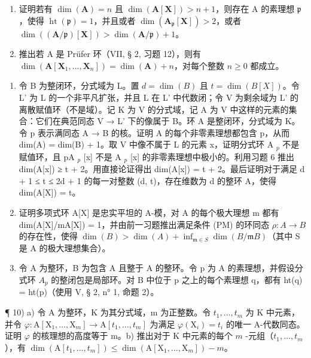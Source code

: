 \begin{enumerate}
\def\labelenumi{\alph{enumi})}
\setcounter{enumi}{1}
\tightlist
\item
  证明若有 \(\dim(\mathbf{A}) = n\) 且 \(\dim(\mathbf{A}[\mathbf{X}]) > n + 1\)，则存在 A 的素理想 \(\mathfrak{p}\)，使得 \(\operatorname{ht}(\mathfrak{p}) = 1\)，并且或者 \(\dim(\mathbf{A}_{\mathfrak{p}}[\mathbf{X}]) > 2\)，或者 \(\dim((\mathbf{A}/\mathfrak{p})[\mathbf{X}]) > \dim(\mathbf{A}/\mathfrak{p}) + 1\)。
\item
  推出若 A 是 Prüfer 环（VII, § 2, 习题 12），则有 \(\dim(\mathbf{A}[\mathbf{X}_1, ..., \mathbf{X}_n]) = \dim(\mathbf{A}) + n\)，对每个整数 \(n \geqslant 0\) 都成立。
\end{enumerate}

\begin{enumerate}
\def\labelenumi{\arabic{enumi})}
\setcounter{enumi}{6}
\item
  令 B 为整闭环，分式域为 L。置 \(d = \dim(B)\) 且 \(t = \dim(B[X])\)。令 L' 为 L 的一个非平凡扩张，并且 L 在 L' 中代数闭；令 V 为剩余域为 L' 的离散赋值环（不是域）。记 K 为 V 的分式域，记 A 为 V 中这样的元素的集合：它们在典范同态 V → L' 下的像属于 B。环 A 是整闭环，分式域为 K。令 p 表示满同态 A → B 的核。证明 A 的每个非零素理想都包含 p，从而 dim(A) = dim(B) + 1。取 V 中像不属于 L 的元素 x，证明分式环 A \(_{p}\) 不是赋值环，且 pA \(_{p}\) {[}x{]} 不是 A \(_{p}\) {[}x{]} 的非零素理想中极小的。利用习题 6 推出 dim(A{[}x{]}) ≥ t + 2。用直接论证得出 dim(A{[}x{]}) = t + 2。最后证明对于满足 d + 1 ≤ t ≤ 2d + 1 的每一对整数 (d, t)，存在维数为 d 的整环 A，使得 dim(A{[}X{]}) = t。
\item
  证明多项式环 A{[}X{]} 是忠实平坦的 A-模，对 A 的每个极大理想 m 都有 dim(A{[}X{]}/mA{[}X{]}) = 1，并由前一习题推出满足条件 (PM) 的环同态 \(\rho: A \to B\) 的存在性，使得 \(\dim(B) > \dim(A) + \inf_{\mathfrak{m}\in S}\dim(B/\mathfrak{m}B)\)（其中 S 是 A 的极大理想集合）。
\item
  令 A 为整环，B 为包含 A 且整于 A 的整环。令 p 为 A 的素理想，并假设分式环 \(A_{p}\) 的整闭包是局部环。对 B 中位于 p 之上的每个素理想 q，都有 ht(q) = ht(p)（使用 V, § 2, n° 1, 命题 2）。
\end{enumerate}

¶ 10) a) 令 A 为整环，K 为其分式域，m 为正整数。令 \(t_1, \ldots, t_m\) 为 K 中元素，并令 \(\varphi: \mathrm{A}[\mathrm{X}_1, \ldots, \mathrm{X}_m] \to \mathrm{A}[t_1, \ldots, t_m]\) 为满足 \(\varphi(\mathrm{X}_i) = t_i\) 的唯一 A-代数同态。证明 \(\varphi\) 的核理想的高度等于 m。b) 推出对于 K 中元素的每个 \(m\) -元组（\(t_1, \ldots, t_m\)），有 \(\dim(\mathrm{A}[t_1, \ldots, t_m]) \leqslant \dim(\mathrm{A}[\mathrm{X}_1, \ldots, \mathrm{X}_m]) - m\)。


